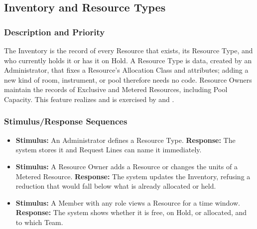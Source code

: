 \subsection{Inventory and Resource Types}\label{feat:inventory}

\subsubsection{Description and Priority}
The Inventory is the record of every Resource that exists, its Resource Type, and who currently holds it or has it on Hold. A Resource Type is data, created by an Administrator, that fixes a Resource's Allocation Class and attributes; adding a new kind of room, instrument, or pool therefore needs no code. Resource Owners maintain the records of Exclusive and Metered Resources, including Pool Capacity. This feature realizes  and is exercised by  and . 

\subsubsection{Stimulus/Response Sequences}
\begin{itemize}
  \item \textbf{Stimulus:} An Administrator defines a Resource Type. \textbf{Response:} The system stores it and Request Lines can name it immediately.
  \item \textbf{Stimulus:} A Resource Owner adds a Resource or changes the units of a Metered Resource. \textbf{Response:} The system updates the Inventory, refusing a reduction that would fall below what is already allocated or held.
  \item \textbf{Stimulus:} A Member with any role views a Resource for a time window. \textbf{Response:} The system shows whether it is free, on Hold, or allocated, and to which Team.
\end{itemize}

